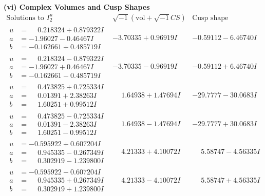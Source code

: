 \documentclass[1p]{elsarticle_modified}
\theoremstyle{definition}
\newcommand{\I}{\sqrt{-1}}
\begin{document}
\newpage\flushleft \textbf{(vi) Complex Volumes and Cusp Shapes}
$$\begin{array}{c|c|c}  
\text{Solutions to }I^u_{2}& \I (\text{vol} + \sqrt{-1}CS) & \text{Cusp shape}\\
 \hline 
\begin{aligned}
u &= \phantom{-}0.218324 + 0.879322 I \\
a &= -1.96027 - 0.46467 I \\
b &= -0.162661 + 0.485719 I\end{aligned}
 & -3.70335 + 0.96919 I & -0.59112 - 6.46740 I \\ \hline\begin{aligned}
u &= \phantom{-}0.218324 - 0.879322 I \\
a &= -1.96027 + 0.46467 I \\
b &= -0.162661 - 0.485719 I\end{aligned}
 & -3.70335 - 0.96919 I & -0.59112 + 6.46740 I \\ \hline\begin{aligned}
u &= \phantom{-}0.473825 + 0.725334 I \\
a &= \phantom{-}0.01391 + 2.38263 I \\
b &= \phantom{-}1.60251 + 0.99512 I\end{aligned}
 & \phantom{-}1.64938 + 1.47694 I & -29.7777 - 30.0683 I \\ \hline\begin{aligned}
u &= \phantom{-}0.473825 - 0.725334 I \\
a &= \phantom{-}0.01391 - 2.38263 I \\
b &= \phantom{-}1.60251 - 0.99512 I\end{aligned}
 & \phantom{-}1.64938 - 1.47694 I & -29.7777 + 30.0683 I \\ \hline\begin{aligned}
u &= -0.595922 + 0.607204 I \\
a &= \phantom{-}0.945335 - 0.267349 I \\
b &= \phantom{-}0.302919 - 1.239800 I\end{aligned}
 & \phantom{-}4.21333 + 4.10072 I & \phantom{-}5.58747 - 4.56335 I \\ \hline\begin{aligned}
u &= -0.595922 - 0.607204 I \\
a &= \phantom{-}0.945335 + 0.267349 I \\
b &= \phantom{-}0.302919 + 1.239800 I\end{aligned}
 & \phantom{-}4.21333 - 4.10072 I & \phantom{-}5.58747 + 4.56335 I \\ \hline\begin{aligned}

\end{aligned}
\end{array}$$
\end{document}
